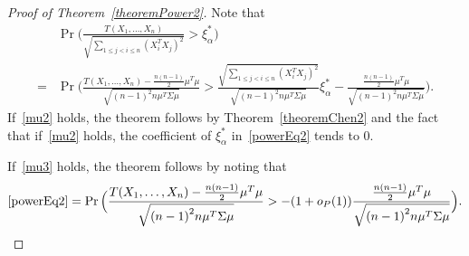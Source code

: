 \documentclass[review]{elsarticle}
\theoremstyle{plain}
\theoremstyle{definition}
\theoremstyle{remark}
\begin{document}
\begin{proof}[Proof of Theorem~\ref{theoremPower2}]
    Note that
    \begin{align}
            &\Pr\Big(\frac{T( X_1,\ldots, X_n)}{\sqrt{\sum_{1\leq j<i\leq n}{(X_i^T X_j)}^2}}>\xi_{\alpha}^* \Big)\nonumber\\
            =&
            \Pr\Big(\frac{T( X_1,\ldots, X_n)-\frac{n(n-1)}{2}\mu^T\mu}{\sqrt{{(n-1)}^2 n \mu^T\Sigma\mu}}>
            \frac{\sqrt{\sum_{1\leq j<i\leq n}{{(X_i^T X_j)}^2}}}{\sqrt{{(n-1)}^2 n \mu^T\Sigma\mu}}\xi_{\alpha}^*-\frac{\frac{n(n-1)}{2}\mu^T\mu}{\sqrt{{(n-1)}^2 n \mu^T\Sigma\mu}} \Big).
            \label{powerEq2}
    \end{align}
    If~\eqref{mu2} holds, the theorem follows by Theorem~\ref{theoremChen2} and the fact that if~\eqref{mu2} holds, the coefficient of $\xi_\alpha^*$ in~\eqref{powerEq2} tends to $0$.

    If~\eqref{mu3} holds, the theorem follows by noting that
    \begin{equation*}
        \begin{aligned}
            \eqref{powerEq2}=
            \Pr\Big(\frac{T( X_1,\ldots, X_n)-\frac{n(n-1)}{2}\mu^T\mu}{\sqrt{{(n-1)}^2 n \mu^T\Sigma\mu}}>
            -(1+o_P(1))\frac{\frac{n(n-1)}{2}\mu^T\mu}{\sqrt{{(n-1)}^2 n \mu^T\Sigma\mu}} \Big).
        \end{aligned}
    \end{equation*}
\end{proof}
\end{document}
